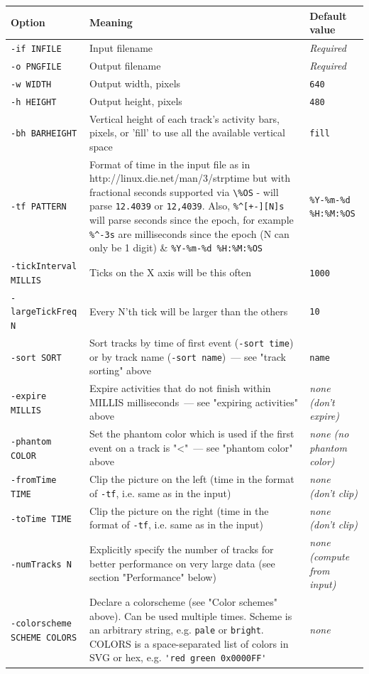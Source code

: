 \documentclass{article}
\begin{document}
\begin{longtable}{|l|p{160px}|l|}
\hline
Option & Meaning & Default value \\
\hline
\endhead
\verb|-if INFILE| & Input filename & \emph{Required} \\
\hline
\verb|-o PNGFILE| & Output filename & \emph{Required} \\
\hline
\verb|-w WIDTH|   & Output width, pixels & \verb|640| \\
\hline
\verb|-h HEIGHT|  & Output height, pixels & \verb|480| \\
\hline
\verb|-bh BARHEIGHT| & Vertical height of each track's activity bars, pixels, or 'fill' to use all the available vertical space & \verb|fill| \\
\hline
\verb|-tf PATTERN| & Format of time in the input file as in http://linux.die.net/man/3/strptime but with fractional seconds supported via \verb|\%OS| - will parse \verb|12.4039| or \verb|12,4039|.  Also, \verb|%^[+-][N]s| will parse seconds since the epoch, for example \verb|%^-3s| are milliseconds since the epoch (N can only be 1 digit) & \verb|%Y-%m-%d %H:%M:%OS| \\
\hline
\verb|-tickInterval MILLIS| & Ticks on the X axis will be this often & \verb|1000| \\
\hline
\verb|-largeTickFreq N| & Every N'th tick will be larger than the others & \verb|10| \\
\hline
\verb|-sort SORT| & Sort tracks by time of first event (\verb|-sort time|) or by track name (\verb|-sort name|)~--- see "track sorting" above & \verb|name| \\
\hline
\verb|-expire MILLIS| & Expire activities that do not finish within MILLIS milliseconds~--- see "expiring activities" above & \emph{none (don't expire)} \\
\hline
\verb|-phantom COLOR| & Set the phantom color which is used if the first event on a track is "<"~--- see "phantom color" above & \emph{none (no phantom color)} \\
\hline
\verb|-fromTime TIME| & Clip the picture on the left (time in the format of \verb|-tf|, i.e. same as in the input) & \emph{none (don't clip)} \\
\hline
\verb|-toTime TIME| & Clip the picture on the right (time in the format of \verb|-tf|, i.e. same as in the input) & \emph{none (don't clip)} \\
\hline
\verb|-numTracks N| & Explicitly specify the number of tracks for better performance on very large data (see section "Performance" below) & \emph{none (compute from input)} \\
\hline
\verb|-colorscheme SCHEME COLORS| & Declare a colorscheme (see "Color schemes" above). Can be used multiple times. Scheme is an arbitrary string, e.g. \verb|pale| or \verb|bright|. COLORS is a space-separated list of colors in SVG or hex, e.g. \verb|'red green 0x0000FF'| & \emph{none} \\
\hline
\end{longtable}
\end{document}
